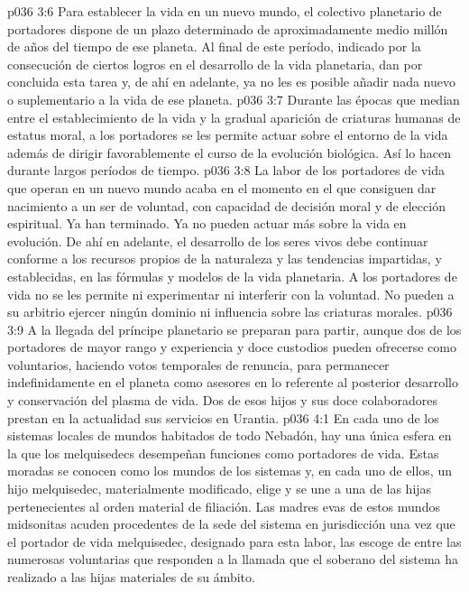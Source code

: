 \vs p036 3:6 \pc Para establecer la vida en un nuevo mundo, el colectivo planetario de portadores dispone de un plazo determinado de aproximadamente medio millón de años del tiempo de ese planeta. Al final de este período, indicado por la consecución de ciertos logros en el desarrollo de la vida planetaria, dan por concluida esta tarea y, de ahí en adelante, ya no les es posible añadir nada nuevo o suplementario a la vida de ese planeta.
\vs p036 3:7 Durante las épocas que median entre el establecimiento de la vida y la gradual aparición de criaturas humanas de estatus moral, a los portadores se les permite actuar sobre el entorno de la vida además de dirigir favorablemente el curso de la evolución biológica. Así lo hacen durante largos períodos de tiempo.
\vs p036 3:8 La labor de los portadores de vida que operan en un nuevo mundo acaba en el momento en el que consiguen dar nacimiento a un ser de voluntad, con capacidad de decisión moral y de elección espiritual. Ya han terminado. Ya no pueden actuar más sobre la vida en evolución. De ahí en adelante, el desarrollo de los seres vivos debe continuar conforme a los recursos propios de la naturaleza y las tendencias impartidas, y establecidas, en las fórmulas y modelos de la vida planetaria. A los portadores de vida no se les permite ni experimentar ni interferir con la voluntad. No pueden a su arbitrio ejercer ningún dominio ni influencia sobre las criaturas morales.
\vs p036 3:9 A la llegada del príncipe planetario se preparan para partir, aunque dos de los portadores de mayor rango y experiencia y doce custodios pueden ofrecerse como voluntarios, haciendo votos temporales de renuncia, para permanecer indefinidamente en el planeta como asesores en lo referente al posterior desarrollo y conservación del plasma de vida. Dos de esos hijos y sus doce colaboradores prestan en la actualidad sus servicios en Urantia.
\vs p036 4:1 En cada uno de los sistemas locales de mundos habitados de todo Nebadón, hay una única esfera en la que los melquisedecs desempeñan funciones como portadores de vida. Estas moradas se conocen como los mundos  de los sistemas y, en cada uno de ellos, un hijo melquisedec, materialmente modificado, elige y se une a una de las hijas pertenecientes al orden material de filiación. Las madres evas de estos mundos midsonitas acuden procedentes de la sede del sistema en jurisdicción una vez que el portador de vida melquisedec, designado para esta labor, las escoge de entre las numerosas voluntarias que responden a la llamada que el soberano del sistema ha realizado a las hijas materiales de su ámbito.
